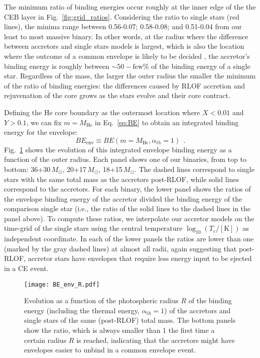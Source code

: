\documentclass[twocolumn,twocolappendix,trackchanges]{aastex63}
\DeclareRobustCommand{\Eqref}[1]{Eq.~\ref{#1}}
\DeclareRobustCommand{\Figref}[1]{Fig.~\ref{#1}}
\begin{document}
The minimum ratio of binding energies occur roughly at the inner edge
of the the CEB layer in \Figref{fig:grid_ratios}. Considering the
ratio to single stars (red lines), the minima range between 0.56-0.07;
0.58-0.08; and 0.51-0.04 from our least to most massive binary. In
other words, at the radius where the difference between accretors and
single stars models is largest, which is also the location where the
outcome of a common envelope is likely to be decided \citep[e.g.,][]{ivanova:2013}, the accretor's
binding energy is roughly between $\sim{}50-\mathrm{few}\%$ of the
binding energy of a single star. Regardless of the mass, the larger
the outer radius the smaller the minimum of the ratio of binding
energies: the differences caused by RLOF accretion and rejuvenation of
the core grows as the stars evolve and their core contract.

Defining the He core boundary as the outermost location where $X<0.01$
and $Y>0.1$, we can fix $m=M_\mathrm{He}$ in \Eqref{eq:BE} to obtain
an integrated binding energy for the envelope:
\begin{equation}
  \label{eq:BE_env}
  BE_\mathrm{env} \equiv BE(m=M_\mathrm{He}, \alpha_{th}=1) \ \ .
\end{equation}
\Figref{fig:BE_env_R} shows the evolution of this integrated envelope
binding energy as a function of the outer radius. Each panel shows one
of our binaries, from top to bottom: 36+30\,$M_\odot$,
20+17\,$M_\odot$, 18+15\,$M_\odot$. The dashed lines correspond to
single stars with the same total mass as the accretors post-RLOF,
while solid lines correspond to the accretors. For each binary, the
lower panel shows the ratios of the envelope binding energy of the
accretor divided the binding energy of the comparison single star
(i.e., the ratio of the solid lines to the dashed lines in the panel
above). To compute these ratios, we interpolate our accretor models
on the time-grid of the single stars using the central temperature
$\log_{10}(T_c/[\mathrm{K}])$ as independent coordinate. In each of
the lower panels the ratios are lower than one (marked by the gray
dashed lines) at almost all radii, again suggesting that post-RLOF,
accretor stars have envelopes that require less energy input to be
ejected in a CE event.

\begin{figure}[tp]
  \centering
  \texttt{[image: BE\_env\_R.pdf]}
  \caption{Evolution as a function of the photospheric radius $R$ of
    the binding energy (including the thermal
    energy, $\alpha_\mathrm{th}=1$) of the accretors and single stars
    of the same (post-RLOF) total mass. The bottom panels show the
    ratio, which is always smaller than 1 the first time a certain
    radius $R$ is reached, indicating that the
    accretors might have envelopes easier to unbind in a common
    envelope event.}
  \label{fig:BE_env_R}
\end{figure}
\end{document}
